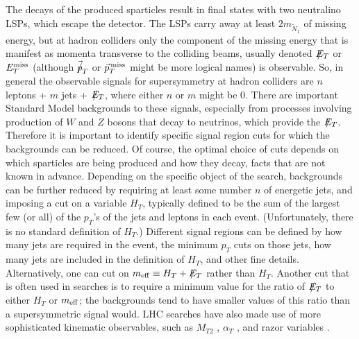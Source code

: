 \documentclass[12pt]{article}
\def\stilde{\widetilde}
\def\NI{\stilde N_1}
\def\Et{{\slashchar{E}_T}}
\def\slashchar#1{\setbox0=\hbox{$#1$}           %
   \dimen0=\wd0                                 %
   \setbox1=\hbox{/} \dimen1=\wd1               %
   \ifdim\dimen0>\dimen1                        %
      \rlap{\hbox to \dimen0{\hfil/\hfil}}      %
      #1                                        %
   \else                                        %
      \rlap{\hbox to \dimen1{\hfil$#1$\hfil}}   %
      /                                         %
   \fi}                                        %
\begin{document}
The decays of the produced sparticles result in final states with two 
neutralino LSPs, which escape the detector. The LSPs carry away at 
least $2 m_{\NI}$ of missing energy, but at hadron colliders only the 
component of the missing energy that is manifest as momenta transverse to 
the colliding beams, usually denoted $\Et$ or $E_T^{\rm miss}$ 
(although $\vec{\slashchar{p}}_T$ or $\vec{p}_T^{\hspace{1.5pt}\rm miss}$ 
might be more logical names) is observable. 
So, in general 
the observable signals for supersymmetry at hadron colliders are $n$ 
leptons + $m$ jets + $\Et$, where either $n$ or $m$ might be 0. There are 
important Standard Model backgrounds to these signals, especially 
from processes involving production of $W$ and $Z$ bosons that decay to 
neutrinos, which provide the $\Et$. Therefore it is important to identify 
specific signal region cuts for which the backgrounds can be reduced. Of course, 
the optimal choice of cuts  
depends on which sparticles are being produced and how they decay, facts that are not known in advance. Depending on the specific object of the search,
backgrounds can be further reduced by 
requiring at least some number $n$ of 
energetic jets, and imposing a cut on a variable $H_T$, 
typically defined to be the sum of the largest 
few (or all) of the $p_T$'s of the jets and leptons in each event. (Unfortunately, there is no standard definition of $H_T$.) Different signal regions can be defined by
how many jets are required in the event, the minimum $p_T$ cuts on those jets, how many 
jets are included in the definition of $H_T$, and other fine details. 
Alternatively, one can cut on $m_{\rm eff} \equiv H_T + \Et$ rather than $H_T$. 
Another cut that is often used in searches is to require a minimum value for the ratio of 
$\Et$ to either $H_T$ or $m_{\rm eff}$; the backgrounds tend to 
have smaller values of this ratio than a supersymmetric signal would.
LHC searches have also made use of more sophisticated kinematic observables,
such as $M_{T2}$ \cite{MT2}, $\alpha_T$ \cite{alphaT}, and razor variables
\cite{razor}.
\end{document}
